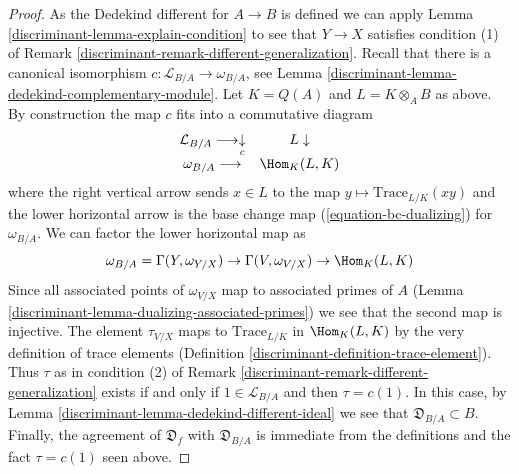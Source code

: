 \begin{proof}

As the Dedekind different for $A \to B$ is defined we can apply
Lemma \ref{discriminant-lemma-explain-condition} to see that
$Y \to X$ satisfies condition (1) of
Remark \ref{discriminant-remark-different-generalization}.
Recall that there is a canonical isomorphism
$c : \mathcal{L}_{B/A} \to \omega_{B/A}$, see
Lemma \ref{discriminant-lemma-dedekind-complementary-module}.
Let $K = Q(A)$ and $L = K \otimes_A B$ as above.
By construction the map $c$ fits into a commutative diagram
$$
\begin{array}{cc}\mathcal{L}_{B/A} \longrightarrow\underset{c}{\downarrow} & L \downarrow \\ \omega_{B/A} \longrightarrow & \Hom_K(L, K)\end{array}
$$
where the right vertical arrow sends $x \in L$ to the map
$y \mapsto \text{Trace}_{L/K}(xy)$ and the lower horizontal
arrow is the base change map (\ref{equation-bc-dualizing}) for $\omega_{B/A}$.
We can factor the lower horizontal map as
$$
\omega_{B/A} = \Gamma(Y, \omega_{Y/X})
\to \Gamma(V, \omega_{V/X}) \to \Hom_K(L, K)
$$
Since all associated points of $\omega_{V/X}$
map to associated primes of $A$
(Lemma \ref{discriminant-lemma-dualizing-associated-primes})
we see that the second map is injective.
The element $\tau_{V/X}$ maps to $\text{Trace}_{L/K}$ in
$\Hom_K(L, K)$ by the very definition of trace elements
(Definition \ref{discriminant-definition-trace-element}).
Thus $\tau$ as in condition (2) of
Remark \ref{discriminant-remark-different-generalization}
exists if and only if $1 \in \mathcal{L}_{B/A}$ and then
$\tau = c(1)$. In this case, by Lemma \ref{discriminant-lemma-dedekind-different-ideal}
we see that $\mathfrak{D}_{B/A} \subset B$.
Finally, the agreement of $\mathfrak{D}_f$ with $\mathfrak{D}_{B/A}$
is immediate from the definitions and the fact $\tau = c(1)$ seen above.
\end{proof}

